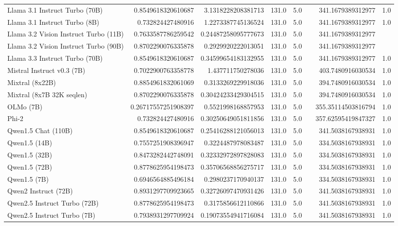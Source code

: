 \begin{table}[htp]
{\begin{tabular}{lrrrrrrr}
Llama 3.1 Instruct Turbo (70B) & 0.8549618320610687 & 3.1318228208381713 & 131.0 & 5.0 &  & 341.1679389312977 & 1.0 \\
Llama 3.1 Instruct Turbo (8B) & 0.732824427480916 & 1.2273387745136524 & 131.0 & 5.0 &  & 341.1679389312977 & 1.0 \\
Llama 3.2 Vision Instruct Turbo (11B) & 0.7633587786259542 & 0.24487258095777673 & 131.0 & 5.0 &  & 341.1679389312977 &  \\
Llama 3.2 Vision Instruct Turbo (90B) & 0.8702290076335878 & 0.2929920222013051 & 131.0 & 5.0 &  & 341.1679389312977 &  \\
Llama 3.3 Instruct Turbo (70B) & 0.8549618320610687 & 0.34599654183132955 & 131.0 & 5.0 &  & 341.1679389312977 & 1.0 \\
Mistral Instruct v0.3 (7B) & 0.7022900763358778 & 1.437711750278036 & 131.0 & 5.0 &  & 403.7480916030534 & 1.0 \\
Mixtral (8x22B) & 0.8854961832061069 & 0.3133269229918036 & 131.0 & 5.0 &  & 394.7480916030534 & 1.0 \\
Mixtral (8x7B 32K seqlen) & 0.8702290076335878 & 0.30424233429304515 & 131.0 & 5.0 &  & 394.7480916030534 & 1.0 \\
OLMo (7B) & 0.26717557251908397 & 0.5521998168857953 & 131.0 & 5.0 &  & 355.35114503816794 & 1.0 \\
Phi-2 & 0.732824427480916 & 0.30250649051811856 & 131.0 & 5.0 &  & 357.62595419847327 & 1.0 \\
Qwen1.5 Chat (110B) & 0.8549618320610687 & 0.25416288121056013 & 131.0 & 5.0 &  & 341.5038167938931 & 1.0 \\
Qwen1.5 (14B) & 0.7557251908396947 & 0.3224487978083487 & 131.0 & 5.0 &  & 334.5038167938931 & 1.0 \\
Qwen1.5 (32B) & 0.8473282442748091 & 0.32332972897828083 & 131.0 & 5.0 &  & 334.5038167938931 & 1.0 \\
Qwen1.5 (72B) & 0.8778625954198473 & 0.35706568856275717 & 131.0 & 5.0 &  & 334.5038167938931 & 1.0 \\
Qwen1.5 (7B) & 0.6946564885496184 & 0.2980237170940137 & 131.0 & 5.0 &  & 334.5038167938931 & 1.0 \\
Qwen2 Instruct (72B) & 0.8931297709923665 & 0.32726097470931426 & 131.0 & 5.0 &  & 341.5038167938931 & 1.0 \\
Qwen2.5 Instruct Turbo (72B) & 0.8778625954198473 & 0.3175856612110866 & 131.0 & 5.0 &  & 341.5038167938931 & 1.0 \\
Qwen2.5 Instruct Turbo (7B) & 0.7938931297709924 & 0.19073554941716084 & 131.0 & 5.0 &  & 341.5038167938931 & 1.0 \\

\end{tabular}}
\end{table}
